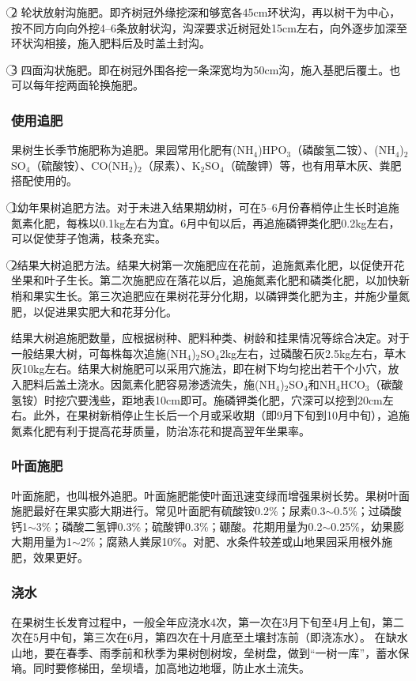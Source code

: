 \documentclass{ctexbook}
\begin{document}
\textcircled{2} 轮状放射沟施肥。即齐树冠外缘挖深和够宽各45cm环状沟，再以树干为中心，按不同方向向外挖4--6条放射状沟，沟深要求近树冠处15cm左右，向外逐步加深至环状沟相接，施入肥料后及时盖土封沟。

\textcircled{3} 四面沟状施肥。即在树冠外围各挖一条深宽均为50cm沟，施入基肥后覆土。也可以每年挖两面轮换施肥。
\subsubsection{使用追肥}
果树生长季节施肥称为追肥。果园常用化肥有(NH$_4$)HPO$_3$（磷酸氢二铵）、(NH$_4$)$_2$SO$_4$（硫酸铵）、CO(NH$_2$)$_2$（尿素）、K$_2$SO$_4$（硫酸钾）等，也有用草木灰、粪肥搭配使用的。

\textcircled{1}幼年果树追肥方法。对于未进入结果期幼树，可在5--6月份春梢停止生长时追施氮素化肥，每株以0.1kg左右为宜。6月中旬以后，再追施磷钾类化肥0.2kg左右，可以促使芽子饱满，枝条充实。

\textcircled{2}结果大树追肥方法。结果大树第一次施肥应在花前，追施氮素化肥，以促使开花坐果和叶子生长。第二次施肥应在落花以后，追施氮素化肥和磷类化肥，以加快新梢和果实生长。第三次追肥应在果树花芽分化期，以磷钾类化肥为主，并施少量氮肥，以促进果实肥大和花芽分化。

结果大树追施肥数量，应根据树种、肥料种类、树龄和挂果情况等综合决定。对于一般结果大树，可每株每次追施(NH$_4$)$_2$SO$_4$2kg左右，过磷酸石灰2.5kg左右，草木灰10kg左右。结果大树施肥可以采用穴施法，即在树下均匀挖出若干个小穴，放入肥料后盖土浇水。因氮素化肥容易渗透流失，施(NH$_4$)$_2$SO$_4$和NH$_4$HCO$_3$（碳酸氢铵）时挖穴要浅些，距地表10cm即可。施磷钾类化肥，穴深可以挖到20cm左右。此外，在果树新梢停止生长后一个月或采收期（即9月下旬到10月中旬），追施氮素化肥有利于提高花芽质量，防治冻花和提高翌年坐果率。
\subsubsection{叶面施肥}
叶面施肥，也叫根外追肥。叶面施肥能使叶面迅速变绿而增强果树长势。果树叶面施肥最好在果实膨大期进行。常见叶面肥有硫酸铵0.2\%；尿素0.3$\sim$0.5\%；过磷酸钙1$\sim$3\%；磷酸二氢钾0.3\%；硫酸钾0.3\%；硼酸。花期用量为0.2$\sim$0.25\%，幼果膨大期用量为1$\sim$2\%；腐熟人粪尿10\%。对肥、水条件较差或山地果园采用根外施肥，效果更好。
\subsubsection{浇水}
在果树生长发育过程中，一般全年应浇水4次，第一次在3月下旬至4月上旬，第二次在5月中旬，第三次在6月，第四次在十月底至土壤封冻前（即浇冻水）。
在缺水山地，要在春季、雨季前和秋季为果树刨树垵，垒树盘，做到“一树一库”，蓄水保墒。同时要修梯田，垒坝墙，加高地边地堰，防止水土流失。
\end{document}
